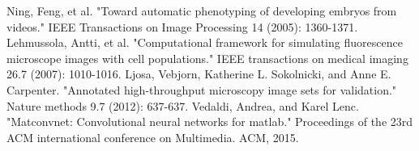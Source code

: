 \documentclass[conference]{IEEEtran}
\begin{document}
\begin{thebibliography}{00}
Ning, Feng, et al. "Toward automatic phenotyping of developing embryos from videos." IEEE Transactions on Image Processing 14 (2005): 1360-1371.
 Lehmussola, Antti, et al. "Computational framework for simulating fluorescence microscope images with cell populations." IEEE transactions on medical imaging 26.7 (2007): 1010-1016.
Ljosa, Vebjorn, Katherine L. Sokolnicki, and Anne E. Carpenter. "Annotated high-throughput microscopy image sets for validation." Nature methods 9.7 (2012): 637-637.
 Vedaldi, Andrea, and Karel Lenc. "Matconvnet: Convolutional neural networks for matlab." Proceedings of the 23rd ACM international conference on Multimedia. ACM, 2015.
\end{thebibliography}
\end{document}
